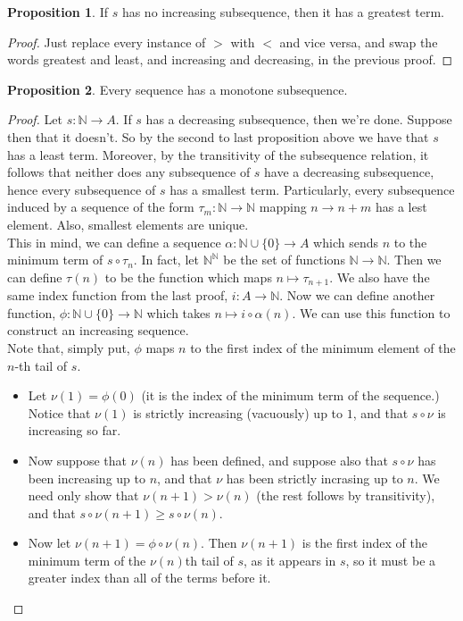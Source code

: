 \documentclass[11pt]{article}
\newcommand{\N}{\mathbb{N}}
\theoremstyle{definition}
\newtheorem{proposition}{Proposition}
\begin{document}
\begin{proposition}
If $s$ has no increasing subsequence, then it has a greatest term.
\end{proposition}

\begin{proof}
Just replace every instance of $>$ with $<$ and vice versa, and swap the words greatest and least, and increasing and decreasing, in the previous proof.
\end{proof}


\begin{proposition}
Every sequence has a monotone subsequence.
\end{proposition}
\begin{proof}
Let $s:\N\to A$. If $s$ has a decreasing subsequence, then we're done. Suppose then that it doesn't. So by the second to last proposition above we have that $s$ has a least term. Moreover, by the transitivity of the subsequence relation, it follows that neither does any subsequence of $s$ have a decreasing subsequence, hence every subsequence of $s$ has a smallest term. Particularly, every subsequence induced by a sequence of the form $\tau_m:\N\to \N$ mapping $n\to n+m$ has a lest element. Also, smallest elements are unique. \\

This in mind, we can define a sequence $\alpha: \N\cup \{0\} \to A$ which sends $n$ to the minimum term of  $s\circ \tau_n$. In fact, let $\N^\N$ be the set of functions $\N\to \N$. Then we can define $\tau(n)$ to be the function which maps $n\mapsto \tau_{n+1}$. We also have the same index function from the last proof, $i:A\to \N$. Now we can define another function, $\phi:\N\cup \{0\}\to \N$ which takes $n\mapsto i\circ \alpha(n)$. We can use this function to construct an increasing sequence. \\

Note that, simply put, $\phi$ maps $n$ to the first index of the minimum element of the $n$-th tail of $s$.

\begin{itemize}
\item Let $\nu(1) = \phi(0)$ (it is the index of the minimum term of the sequence.) Notice that $\nu(1)$ is strictly increasing (vacuously) up to $1$, and that $s\circ \nu$ is increasing so far.
\item Now suppose that $\nu(n)$ has been defined, and suppose also that $s\circ\nu$ has been increasing up to $n$, and that $\nu$ has been strictly incrasing up to $n$. We need only show that $\nu(n+1) > \nu(n)$ (the rest follows by transitivity), and that $s\circ \nu(n+1) \ge s\circ \nu(n).$
\item Now let $\nu(n+1) = \phi\circ \nu(n)$. Then $\nu(n+1)$ is the first index of the minimum term of the $\nu(n)$th tail of $s$, as it appears in $s$, so it must be a greater index than all of the terms before it. \\


\end{itemize}
\end{proof}
\end{document}
